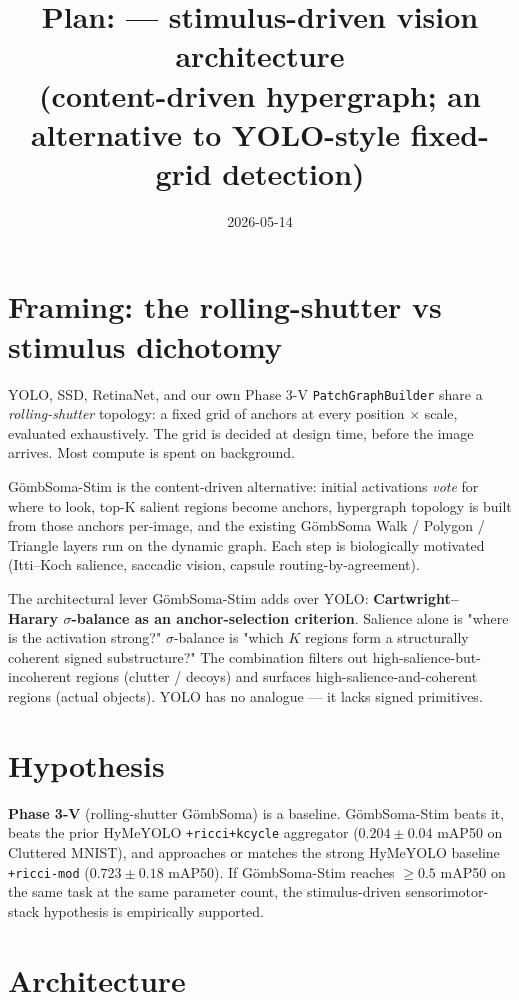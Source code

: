 \documentclass[11pt,a4paper]{article}
\title{Plan: \Stim{} --- stimulus-driven vision architecture\\
       \large{(content-driven hypergraph; an alternative to YOLO-style fixed-grid detection)}}
\date{2026-05-14}
\author{}
\newcommand{\sig}{\ensuremath{\sigma}}
\newcommand{\Soma}{G\"ombSoma}
\newcommand{\Stim}{\Soma-Stim}
\begin{document}
\maketitle

\section{Framing: the rolling-shutter vs stimulus dichotomy}

YOLO, SSD, RetinaNet, and our own Phase 3-V \texttt{PatchGraphBuilder}
share a \emph{rolling-shutter} topology: a fixed grid of anchors at
every position $\times$ scale, evaluated exhaustively. The grid is
decided at design time, before the image arrives. Most compute is
spent on background.

\Stim{} is the content-driven alternative: initial activations
\emph{vote} for where to look, top-K salient regions become anchors,
hypergraph topology is built from those anchors per-image, and the
existing \Soma{} Walk / Polygon / Triangle layers run on the dynamic
graph. Each step is biologically motivated (Itti--Koch salience,
saccadic vision, capsule routing-by-agreement).

The architectural lever \Stim{} adds over YOLO: \textbf{Cartwright--
Harary $\sig$-balance as an anchor-selection criterion}. Salience
alone is "where is the activation strong?" $\sig$-balance is "which
$K$ regions form a structurally coherent signed substructure?" The
combination filters out high-salience-but-incoherent regions
(clutter / decoys) and surfaces high-salience-and-coherent regions
(actual objects). YOLO has no analogue --- it lacks signed primitives.

\section{Hypothesis}

\textbf{Phase 3-V} (rolling-shutter \Soma) is a baseline. \Stim{}
beats it, beats the prior HyMeYOLO \texttt{+ricci+kcycle} aggregator
($0.204 \pm 0.04$ mAP50 on Cluttered MNIST), and approaches or
matches the strong HyMeYOLO baseline \texttt{+ricci-mod}
($0.723 \pm 0.18$ mAP50). If \Stim{} reaches $\geq 0.5$ mAP50 on
the same task at the same parameter count, the stimulus-driven
sensorimotor-stack hypothesis is empirically supported.

\section{Architecture}
\end{document}
